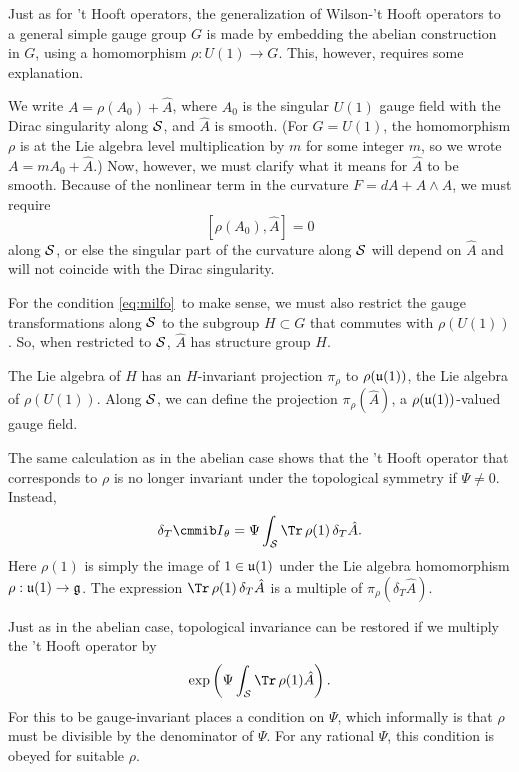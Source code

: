 \par{}

Just as for 't Hooft operators, the generalization of Wilson-'t
Hooft operators to a general simple gauge group $G$ is made by
embedding the abelian construction in $G$, using a homomorphism
$\rho:U(1)\to G$.  This, however, requires some explanation.

We  write $A=\rho(A_0)+\hat A$, where $A_0$ is the singular $U(1)$
gauge field with the Dirac singularity along ${{\cal S}}$, and
$\hat A$ is smooth.  (For $G=U(1)$, the homomorphism $\rho$ is at
the Lie algebra level multiplication by $m$ for some integer $m$,
so we wrote $A=mA_0+\hat A$.)  Now, however, we must clarify what
it means for $\hat A$ to be smooth.  Because of the nonlinear term
in the curvature $F=dA+A\wedge A$, we must require
\setcounter{equation}{17}
\begin{equation}\label{eq:milfo}
[\rho(A_0),\hat A]=0
\end{equation}
 along ${{\cal S}}$, or else the
singular part of the curvature along ${{\cal S}}$ will depend on
$\hat A$ and will not coincide with the Dirac singularity.

For the condition \eqref{eq:milfo}\ to make sense, we must also restrict the
gauge transformations along ${{\cal S}}$ to the subgroup $H\subset
G$ that commutes with $\rho(U(1))$.  So, when restricted to
${{\cal S}}$, $\hat A$ has structure group $H$.

The Lie algebra of $H$ has an $H$-invariant projection $\pi_\rho$
to $\rho(\frak{u}(1))$, the Lie algebra of $\rho(U(1))$. Along
${{\cal S}}$, we can define the projection $\pi_\rho(\hat A)$, a
$\rho(\frak{u}(1))$-valued gauge field.

The same calculation as in the abelian case shows that the 't
Hooft operator that corresponds to $\rho$ is no longer invariant
under the topological symmetry  if $\Psi\not= 0$. Instead,
\setcounter{equation}{18}
\begin{equation}\label{eq:yugo}
\delta_T {{\cmmib I}}_\theta={\Psi}\int_{{\cal S}}
\Tr\,\rho(1)\,\delta_T\hat A.
\end{equation}
 Here $\rho(1)$ is simply the image
of $1\in \frak u(1)$ under the Lie algebra homomorphism
$\rho:\frak u(1)\to \frak g$.  The expression $\Tr\,\rho(1)\,
\delta_T \hat A$ is a multiple of $\pi_\rho(\delta_T\hat A)$.

Just as in the abelian case, topological invariance can be
restored if we multiply the 't Hooft operator by
\setcounter{equation}{19}
\begin{equation}\label{eq:yrot}
\exp\left(\Psi\int_{{\cal S}} \Tr \,\rho(1)\hat A\right).
\end{equation}
 For this to be
gauge-invariant places a condition on $\Psi$, which informally is
that $\rho$ must be divisible by the denominator of $\Psi$.  For
any rational $\Psi$, this condition is obeyed for suitable $\rho$.

